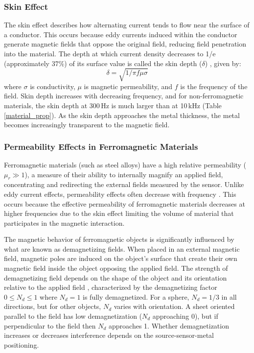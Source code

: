 \documentclass[journal,twoside,web]{ieeecolor}
\begin{document}
\subsubsection{Skin Effect}
The skin effect describes how alternating current tends to flow near the surface of a conductor. This occurs because eddy currents induced within the conductor generate magnetic fields that oppose the original field, reducing field penetration into the material. The  depth at which current density decreases to 1/e (approximately 37\%) of its surface value is called the skin depth ($\delta$) \cite{wheeler_formulas_1942}, given by:
\begin{equation}
\delta =  \sqrt{1/{\pi f \mu \sigma}}
\label{eq:skin_depth}
\end{equation}
where $\sigma$ is conductivity, $\mu$ is magnetic permeability, and $f$ is the frequency of the field. Skin depth increases with decreasing frequency, and for non-ferromagnetic materials, the skin depth at 300\,Hz is much larger than at 10\,kHz (Table \ref{material_prop}). As the skin depth approaches the metal thickness, the metal becomes increasingly transparent to the magnetic field.

\subsubsection{Permeability Effects in Ferromagnetic Materials}
Ferromagnetic materials (such as steel alloys) have a high relative permeability ($\mu_r \gg 1$), a measure of their ability to internally magnify an applied field, concentrating and redirecting the external fields measured by the sensor. Unlike eddy current effects, permeability effects often decrease with frequency \cite{bowler_frequency-dependence_2006}. This occurs because the effective permeability of ferromagnetic materials decreases at higher frequencies due to the skin effect limiting the volume of material that participates in the magnetic interaction.

The magnetic behavior of ferromagnetic objects is significantly influenced by what are known as demagnetizing fields. When placed in an external magnetic field, magnetic poles are induced on the object's surface that create their own magnetic field inside the object opposing the applied field.
The strength of demagnetizing field depends on the shape of the object and its orientation relative to the applied field \cite{prozorov_effective_2018}, characterized by the demagnetizing factor $0 \leq N_d \leq 1$ where $N_d=1$ is fully demagnetized. For a sphere, $N_d = 1/3$ in all directions, but for other objects, $N_d$ varies with orientation. A sheet oriented parallel to the field has low demagnetization ($N_d$ approaching $0$),  but if perpendicular to the field then $N_d$ approaches 1. Whether demagnetization increases or decreases interference depends on the source-sensor-metal positioning.
\end{document}

